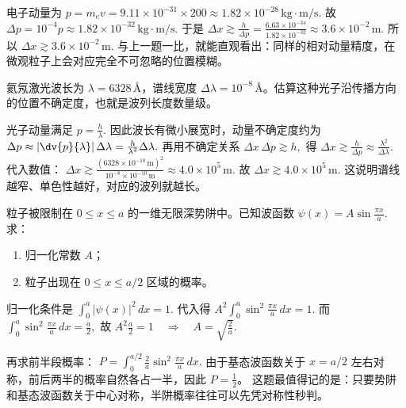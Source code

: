 \documentclass[lang=cn,11pt]{elegantbook}
\begin{document}
\begin{solution}
电子动量为
 \(p=m_ev=9.11\times 10^{-31}\times 200 \approx 1.82\times 10^{-28}\,\mathrm{kg\cdot m/s}.\) 
故
 \(\Delta p=10^{-4}p\approx 1.82\times 10^{-32}\,\mathrm{kg\cdot m/s}.\) 
于是
 \(\Delta x\gtrsim \frac{h}{\Delta p} =\frac{6.63\times 10^{-34}}{1.82\times 10^{-32}} \approx 3.6\times 10^{-2}\,\mathrm{m}.\) 
所以
 \(\boxed{\Delta x\gtrsim 3.6\times 10^{-2}\,\mathrm{m}.}\) 
与上一题一比，就能直观看出：同样的相对动量精度，在微观粒子上会对应完全不可忽略的位置模糊。
\end{solution}

\begin{exercise}[由谱线宽度估算光子波列长度]
氦氖激光波长为 \(\lambda=6328\,\text{\AA}\)，谱线宽度 \(\Delta\lambda=10^{-8}\,\text{\AA}\)。估算这种光子沿传播方向的位置不确定度，也就是波列长度数量级。
\end{exercise}

\begin{solution}
光子动量满足
 \(p=\frac{h}{\lambda}.\) 
因此波长有微小展宽时，动量不确定度约为
 \(\Delta p\approx \left|\dv{p}{\lambda}\right|\Delta\lambda =\frac{h}{\lambda^2}\Delta\lambda.\) 
再用不确定关系
 \(\Delta x\,\Delta p\gtrsim h,\) 
得
 \(\Delta x\gtrsim \frac{h}{\Delta p} \approx \frac{\lambda^2}{\Delta\lambda}.\) 
代入数值：
 \(\Delta x\gtrsim \frac{(6328\times 10^{-10}\,\mathrm{m})^2}{10^{-8}\times 10^{-10}\,\mathrm{m}} \approx 4.0\times 10^5\,\mathrm{m}.\) 
故
 \(\boxed{\Delta x\gtrsim 4.0\times 10^5\,\mathrm{m}.}\) 
这说明谱线越窄、单色性越好，对应的波列就越长。
\end{solution}

\begin{exercise}[无限深势阱基态的归一化与半阱概率]
粒子被限制在 \(0\le x\le a\) 的一维无限深势阱中。已知波函数
 \(\psi(x)=A\sin\frac{\pi x}{a}.\) 
求：
\begin{enumerate}
 \item 归一化常数 \(A\)；
 \item 粒子出现在 \(0\le x\le a/2\) 区域的概率。
\end{enumerate}
\end{exercise}

\begin{solution}
归一化条件是
 \(\int_0^a |\psi(x)|^2\,dx=1.\) 
代入得
 \(A^2\int_0^a \sin^2\frac{\pi x}{a}\,dx=1.\) 
而
 \(\int_0^a \sin^2\frac{\pi x}{a}\,dx=\frac{a}{2},\) 
故
 \(A^2\frac{a}{2}=1 \quad\Longrightarrow\quad \boxed{A=\sqrt{\frac{2}{a}}}.\) 

再求前半段概率：
 \(P=\int_0^{a/2}\frac{2}{a}\sin^2\frac{\pi x}{a}\,dx.\) 
由于基态波函数关于 \(x=a/2\) 左右对称，前后两半的概率自然各占一半，因此 \(P=\frac12\)。
这题最值得记的是：只要势阱和基态波函数关于中心对称，半阱概率往往可以先凭对称性秒判。
\end{solution}
\end{document}
